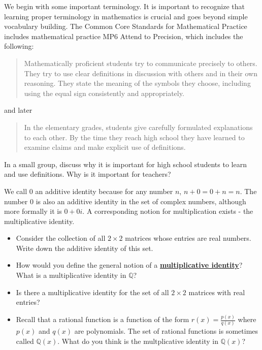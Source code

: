 \documentclass[11pt]{article}
\newenvironment{task}
	{\begin{mdframed}[linecolor=lightgray, linewidth=3pt]\raggedright}
	{\end{mdframed}}
\renewcommand\emph[1]{\underline{\bf{#1}}} %
\theoremstyle{definition}
\begin{document}
We begin with some important terminology. It is important to recognize that learning proper terminology in mathematics is crucial and goes beyond simple vocabulary 
building. The Common Core Standards for Mathematical Practice includes mathematical practice MP6 Attend to Precision, which includes the following:

\begin{quote}
Mathematically proficient students try to communicate precisely to others. They try to use clear definitions in discussion with others and in their own reasoning. 
They state the meaning of the symbols they choose, including using the equal sign consistently and appropriately. 
\end{quote}
and later
\begin{quote}
In the elementary grades, students give carefully formulated explanations to each other. By the time they reach high school they have learned to examine claims and make explicit use of definitions.
\end{quote}

\begin{task}
  In a small group, discuss why it is important for high school students to learn and use definitions. Why is it important for teachers?
\end{task}

We call $0$ an additive identity because for any number $n$, $n+0 = 0 + n = n$. The number $0$ is also an additive identity in the set of complex numbers,
although more formally it is $0+0i$. A corresponding notion for multiplication exists - the multiplicative identity.

\begin{task}
  \begin{itemize}
    \item Consider the collection of all $2\times 2$ matrices whose entries are real numbers. Write down the additive identity of this set.
    \item How would you define the general notion of a \emph{multiplicative identity}? What is a multiplicative identity in $\mathbb{Q}$?
    \item Is there a multiplicative identity for the set of all $2\times 2$ matrices with real entries?
    \item Recall that a rational function is a function of the form $r(x) = \frac{p(x)}{q(x)}$ where $p(x)$ and $q(x)$ are polynomials. The set
      of rational functions is sometimes called $\mathbb{Q}(x)$. What do you think is the multplicative identity in $\mathbb{Q}(x)$?
  \end{itemize}
\end{task}
\end{document}
